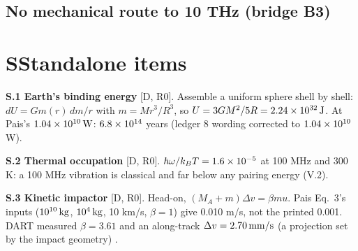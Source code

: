\subsection{No mechanical route to 10 THz (bridge B3)}

\section*{S\quad Standalone items}
\noindent\textbf{S.1 Earth's binding energy} [D, R0]. Assemble a uniform sphere shell by shell: $dU=Gm(r)\,dm/r$ with $m=Mr^3/R^3$, so
$U=3GM^2/5R=2.24\times10^{32}\,\mathrm{J}$. At Pais's $1.04\times10^{10}\,\mathrm{W}$: $6.8\times10^{14}$ years (ledger 8 wording corrected to $1.04\times10^{10}$ W).

\smallskip\noindent\textbf{S.2 Thermal occupation} [D, R0]. $\hbar\omega/k_BT=1.6\times10^{-5}$ at 100 MHz and 300 K: a 100 MHz vibration is classical
and far below any pairing energy (V.2).

\smallskip\noindent\textbf{S.3 Kinetic impactor} [D, R0]. Head-on, $(M_A+m)\Delta v=\beta mu$. Pais Eq.~3's inputs ($10^{10}\,\mathrm{kg}$, $10^4\,\mathrm{kg}$,
10 km/s, $\beta=1$) give 0.010 m/s, not the printed 0.001. DART measured $\beta=3.61$ and an along-track $\Delta v=2.70\,\mathrm{mm/s}$ (a projection
set by the impact geometry) \cite{dart}.









